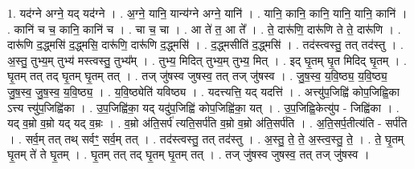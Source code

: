 \documentclass[17pt]{extarticle}
\begin{document}
1. यद॑ग्ने अग्ने॒ यद् यद॑ग्ने । . अ॒ग्ने॒ यानि॒ यान्य॑ग्ने अग्ने॒ यानि॑ । . यानि॒ कानि॒ कानि॒ यानि॒ यानि॒ कानि॑ । . कानि॑ च च॒ कानि॒ कानि॑ च । . चा च॒ चा । . आ ते॑ त॒ आ ते᳚ । . ते॒ दारू॑णि॒ दारू॑णि ते ते॒ दारू॑णि । . दारू॑णि द॒द्ध्मसि॑ द॒द्ध्मसि॒ दारू॑णि॒ दारू॑णि द॒द्ध्मसि॑ । . द॒द्ध्मसीति॑ द॒द्ध्मसि॑ । . तद॑स्त्वस्तु॒ तत् तद॑स्तु । . अ॒स्तु॒ तुभ्य॒म् तुभ्य॑ मस्त्वस्तु॒ तुभ्य᳚म् । . तुभ्य॒ मिदित् तुभ्य॒म् तुभ्य॒ मित् । . इद् घृ॒तम् घृ॒त मिदिद् घृ॒तम् । . घृ॒तम् तत् तद् घृ॒तम् घृ॒तम् तत् । . तज् जु॑षस्व जुषस्व॒ तत् तज् जु॑षस्व । . जु॒ष॒स्व॒ य॒वि॒ष्ठ्य॒ य॒वि॒ष्ठ्य॒ जु॒ष॒स्व॒ जु॒ष॒स्व॒ य॒वि॒ष्ठ्य॒ । . य॒वि॒ष्ठ्येति॑ यविष्ठ्य । . यदत्त्यत्ति॒ यद् यदत्ति॑ । . अत्त्यु॑प॒जिह्वि॑ कोप॒जिह्वि॒का ऽत्त्य त्त्यु॑प॒जिह्वि॑का । . उ॒प॒जिह्वि॑का॒ यद् यदु॑प॒जिह्वि॑ कोप॒जिह्वि॑का॒ यत् । . उ॒प॒जिह्वि॒केत्यु॑प - जिह्वि॑का । . यद् व॒म्रो व॒म्रो यद् यद् व॒म्रः । . व॒म्रो अ॑ति॒सर्प॑ त्यति॒सर्प॑ति व॒म्रो व॒म्रो अ॑ति॒सर्प॑ति । . अ॒ति॒सर्प॒तीत्य॑ति - सर्प॑ति । . सर्व॒म् तत् तथ् सर्वꣳ॒॒ सर्व॒म् तत् । . तद॑स्त्वस्तु॒ तत् तद॑स्तु । . अ॒स्तु॒ ते॒ ते॒ अ॒स्त्व॒स्तु॒ ते॒ । . ते॒ घृ॒तम् घृ॒तम् ते॑ ते घृ॒तम् । . घृ॒तम् तत् तद् घृ॒तम् घृ॒तम् तत् । . तज् जु॑षस्व जुषस्व॒ तत् तज् जु॑षस्व । \newline
\end{document}
